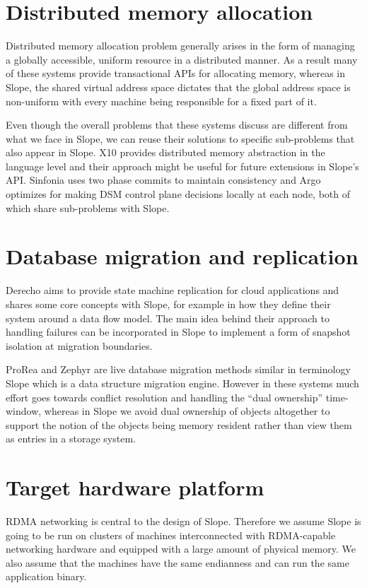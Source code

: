 \section{Distributed memory allocation}
Distributed memory allocation problem generally arises in the form of managing
a globally accessible, uniform resource in a distributed manner. As a result
many of these systems provide transactional APIs for allocating memory,
whereas in
Slope, the shared virtual address space dictates that the global address space
is non-uniform with every machine being responsible for a fixed part of it.

Even though the overall problems that these systems discuss are different from
what we face in Slope, we can reuse their solutions to specific sub-problems that
also appear in Slope. X10 \cite{charles2005x10} provides distributed memory
abstraction in the language level and their approach might be useful for
future extensions in Slope's API. Sinfonia \cite{aguilera2007sinfonia} uses
two phase commits to maintain consistency and Argo \cite{kaxiras2015turning}
optimizes for making DSM control plane decisions locally at each node, both of
which share sub-problems with Slope.

\section{Database migration and replication}
Derecho \cite{jha2019derecho} aims to provide state machine replication
for cloud applications and shares some core concepts with Slope, for
    example in how they define their system around a data flow model.
    The main idea behind their approach to handling failures can be
    incorporated in Slope to implement a form of snapshot isolation at
    migration boundaries.

ProRea \cite{ProRea2013} and Zephyr \cite{zephyr2011elmore} are live
database migration methods similar in terminology Slope which is a
data structure migration engine. However in these systems much effort goes
towards conflict resolution and handling the ``dual ownership''
time-window, whereas in Slope we avoid dual ownership of objects
altogether to support the notion of the objects being memory resident
rather than view them as entries in a storage system.

\section{Target hardware platform}
RDMA networking is central to the design of Slope. Therefore we assume Slope
is going to be run on clusters of machines interconnected with RDMA-capable
networking hardware and equipped with a large amount of physical memory. We
also assume that the machines have the same endianness and can run the same
application binary.

